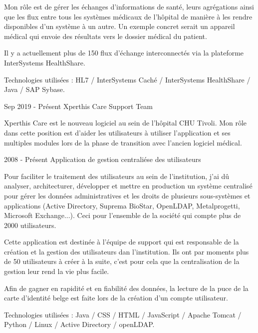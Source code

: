 \begin{cventries}
{    Mon rôle est de gérer les échanges d'informations de santé, leurs agrégations ainsi que les flux entre tous les systèmes médicaux de l'hôpital de manière à les rendre disponibles d'un système à un autre.
    Un exemple concret serait un appareil médical qui envoie des résultats vers le dossier médical du patient. 
    
    Il y a actuellement plus de 150 flux d'échange interconnectés via la plateforme InterSystems HealthShare. 

    Technologies utilisées : HL7 / InterSystems Caché / InterSystems HealthShare / Java / SAP Sybase.

    }
    

  \cventry
    {Sep 2019 - Présent} %
    {Xperthis Care Support Team} %
    {} %
    {} %
    {
    Xperthis Care est le nouveau logiciel au sein de l'hôpital CHU Tivoli. Mon rôle dans cette position est d'aider les utilisateurs à utiliser l'application et ses multiples modules lors de la phase de transition avec l'ancien logiciel médical.

    }
    
  \cventry
    {2008 - Présent} %
    {Application de gestion centraliése des utilisateurs} %
    {} %
    {} %
    {
    Pour faciliter le traitement des utilisateurs au sein de l'institution, j'ai dû analyser, architecturer, développer et mettre en production un système centralisé pour gérer les données administratives et les droits de plusieurs sous-systèmes et applications (Active Directory, Suprema BioStar, OpenLDAP, Metalprogetti, Microsoft Exchange...). Ceci pour l'ensemble de la société qui compte plus de 2000 utilisateurs.
    
    Cette application est destinée à l'équipe de support qui est responsable de la création et la gestion des utilisateurs dan l'institution. Ils ont par moments plus de 50 utilisateurs à créer à la suite, c'est pour cela que la centralisation de la gestion leur rend la vie plus facile. 
    
    Afin de gagner en rapidité et en fiabilité des données, la lecture de la puce de la carte d'identité belge est faite lors de la création d'un compte utilisateur. 

    Technologies utilisées : Java / CSS / HTML / JavaScript / Apache Tomcat / Python / Linux / Active Directory / openLDAP.

}
\end{cventries}
